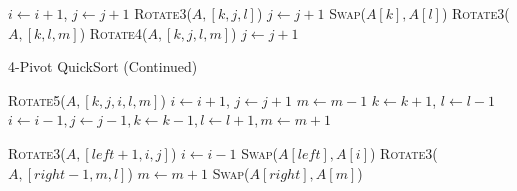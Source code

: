 \documentclass[a4paper,oneside,12pt]{book}
\begin{document}
\begin{algorithm}[H]
\begin{algorithmic}[1]
                    \State $i \gets i + 1$, $j \gets j + 1$
                    \State \textsc{Rotate3}($A, [k, j, l]$)
                    \State $j \gets j + 1$
                \Else
                    \State \textsc{Swap}($A[k], A[l]$)
                \EndIf
            \Else {}
                    \State \textsc{Rotate3}($A, [k, l, m]$)
                    \State \textsc{Rotate4}($A, [k, j, l, m]$)
                    \State $j \gets j + 1$

    \end{algorithmic}
\end{algorithm}

\begin{algorithm}[H]
    \small
    \caption{4-Pivot QuickSort (Continued)}\label{4PivotQuickSort2}
    \begin{algorithmic}[1]
                \Else
                \State \textsc{Rotate5}($A, [k, j, i, l, m]$)
                \State $i \gets i + 1$, $j \gets j + 1$
            \EndIf
            \State $m \gets m - 1$
        \EndIf
        \State $k \gets k + 1$, $l \gets l - 1$
        \EndIf
        \EndWhile
        \State $i \gets i - 1, j \gets j - 1, k \gets k - 1, l \gets l + 1, m \gets m + 1$
        
        \State \textsc{Rotate3}($A, [left + 1, i, j]$)
        \State $i \gets i - 1$
        \State \textsc{Swap}($A[left], A[i]$)
        \State \textsc{Rotate3}($A, [right - 1, m, l]$)
        \State $m \gets m + 1$
        \State \textsc{Swap}($A[right], A[m]$)
        \EndProcedure
    \end{algorithmic}
\end{algorithm}
\end{document}
